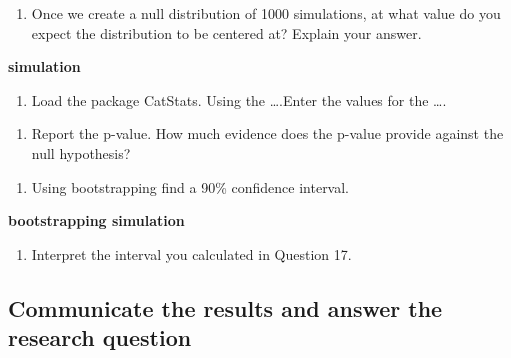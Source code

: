 \documentclass[
]{report}
\providecommand{\tightlist}{%
  \setlength{\itemsep}{0pt}\setlength{\parskip}{0pt}}
\begin{document}
\vspace{1in}

\begin{enumerate}
\def\labelenumi{\arabic{enumi}.}
\setcounter{enumi}{13}
\tightlist
\item
  Once we create a null distribution of 1000 simulations, at what value do you expect the distribution to be centered at? Explain your answer.
\end{enumerate}

\vspace{1in}

\textbf{simulation}

\begin{enumerate}
\def\labelenumi{\arabic{enumi}.}
\setcounter{enumi}{14}
\tightlist
\item
  Load the package CatStats. Using the \ldots.Enter the values for the \ldots.
\end{enumerate}

\vspace{1in}

\begin{enumerate}
\def\labelenumi{\arabic{enumi}.}
\setcounter{enumi}{15}
\tightlist
\item
  Report the p-value. How much evidence does the p-value provide against the null hypothesis?
\end{enumerate}

\vspace{1in}

\begin{enumerate}
\def\labelenumi{\arabic{enumi}.}
\setcounter{enumi}{16}
\tightlist
\item
  Using bootstrapping find a 90\% confidence interval.
\end{enumerate}

\textbf{bootstrapping simulation}

\begin{enumerate}
\def\labelenumi{\arabic{enumi}.}
\setcounter{enumi}{17}
\tightlist
\item
  Interpret the interval you calculated in Question 17.
\end{enumerate}

\vspace{1in}

\hypertarget{communicate-the-results-and-answer-the-research-question}{%
\subsection{Communicate the results and answer the research question}\label{communicate-the-results-and-answer-the-research-question}}
\end{document}
